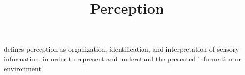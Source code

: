 \documentclass[a4paper]{article}
\title{Perception}
\date{}
\begin{document}
    \maketitle
     defines perception as organization, identification, and interpretation of sensory information, in order to represent and understand the presented information or environment
\end{document}
